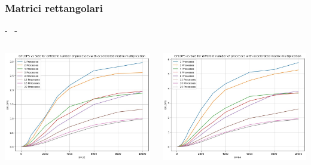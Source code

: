 \documentclass[compress]{beamer}
\begin{document}
\subsubsection*{Matrici rettangolari}
\begin{frame}{\secname \text{ }- \subsecname\ \text{ }- \subsubsecname}
    \begin{columns}
            \begin{minipage}{0.75\textwidth}
                \centering
                \begin{adjustbox}{margin=2cm 0cm 0cm 0cm, center} %
                    \includegraphics[width=1.1\textwidth, frame]{resources/mpi_cuda_32.jpg}
                \end{adjustbox}
            \end{minipage}
            \begin{minipage}{0.75\textwidth}
                \centering
                \begin{adjustbox}{margin=1cm 0cm 0cm 0cm, center} %
                    \includegraphics[width=1.1\textwidth, frame]{resources/mpi_cuda_64.jpg}

\end{adjustbox}
\end{minipage}
\end{columns}
\end{frame}
\end{document}
